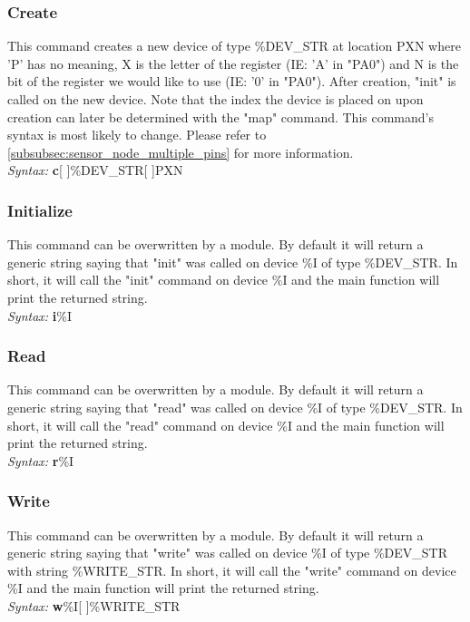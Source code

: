 \documentclass{article}
\begin{document}
\subsubsection{Create}

This command creates a new device of type \%DEV\_STR at location PXN where 'P' has no meaning, X is the letter of the register (IE: 'A' in "PA0") and N is the bit of the register we would like to use (IE: '0' in "PA0"). After creation, "init" is called on the new device. Note that the index the device is placed on upon creation can later be determined with the "map" command. This command's syntax is most likely to change. Please refer to \autoref{subsubsec:sensor_node_multiple_pins} for more information.
\\
\textit{Syntax: }\textbf{c}[ ]\%DEV\_STR[ ]PXN

\subsubsection{Initialize}

This command can be overwritten by a module. By default it will return a generic string saying that "init" was called on device \%I of type \%DEV\_STR. In short, it will call the "init" command on device \%I and the main function will print the returned string.
\\
\textit{Syntax: }\textbf{i}\%I

\subsubsection{Read}

This command can be overwritten by a module. By default it will return a generic string saying that "read" was called on device \%I of type \%DEV\_STR. In short, it will call the "read" command on device \%I and the main function will print the returned string.
\\
\textit{Syntax: }\textbf{r}\%I

\subsubsection{Write}

This command can be overwritten by a module. By default it will return a generic string saying that "write" was called on device \%I of type \%DEV\_STR with string \%WRITE\_STR. In short, it will call the "write" command on device \%I and the main function will print the returned string.
\\
\textit{Syntax: }\textbf{w}\%I[ ]\%WRITE\_STR
\end{document}
